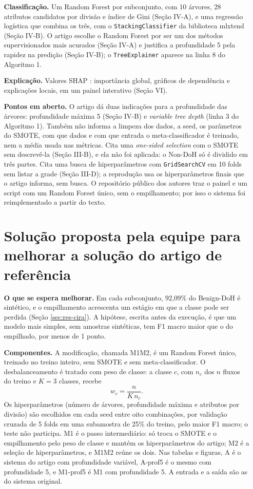 \documentclass[conference]{IEEEtran}
\begin{document}
\textbf{Classificação.} Um Random Forest por subconjunto, com 10 árvores, 28 atributos candidatos por divisão e índice de Gini (Seção IV-A), e uma regressão logística que combina os três, com o \texttt{StackingClassifier} da biblioteca mlxtend (Seção IV-B). O artigo escolhe o Random Forest por ser um dos métodos supervisionados mais acurados (Seção IV-A) e justifica a profundidade 5 pela rapidez na predição (Seção IV-B); o \texttt{TreeExplainer} aparece na linha 8 do Algoritmo 1.

\textbf{Explicação.} Valores SHAP \cite{lundberg2017}: importância global, gráficos de dependência e explicações locais, em um painel interativo (Seção VI).

\textbf{Pontos em aberto.} O artigo dá duas indicações para a profundidade das árvores: profundidade máxima 5 (Seção IV-B) e \textit{variable tree depth} (linha 3 do Algoritmo 1). Também não informa a limpeza dos dados, a seed, os parâmetros do SMOTE, com que dados e com que entrada o meta-classificador é treinado, nem a média usada nas métricas. Cita uma \textit{one-sided selection} com o SMOTE sem descrevê-la (Seção III-B), e ela não foi aplicada: o Non-DoH só é dividido em três partes. Cita uma busca de hiperparâmetros com \texttt{GridSearchCV} em 10 folds sem listar a grade (Seção III-D); a reprodução usa os hiperparâmetros finais que o artigo informa, sem busca. O repositório público dos autores traz o painel e um script com um Random Forest único, sem o empilhamento; por isso o sistema foi reimplementado a partir do texto.

\section{Solução proposta pela equipe para melhorar a solução do artigo de referência}
\label{sec:equipe}

\textbf{O que se espera melhorar.} Em cada subconjunto, 92,09\% do Benign-DoH é sintético, e o empilhamento acrescenta um estágio em que a classe pode ser perdida (Seção \ref{sec:res-cira}). A hipótese, escrita antes da execução, é que um modelo mais simples, sem amostras sintéticas, tem F1 macro maior que o do empilhado, por menos de 1 ponto.

\textbf{Componentes.} A modificação, chamada M1M2, é um Random Forest único, treinado no treino inteiro, sem SMOTE e sem meta-classificador. O desbalanceamento é tratado com peso de classe: a classe $c$, com $n_c$ dos $n$ fluxos do treino e $K=3$ classes, recebe
\begin{equation}
w_c = \frac{n}{K\, n_c}.
\label{eq:peso}
\end{equation}
Os hiperparâmetros (número de árvores, profundidade máxima e atributos por divisão) são escolhidos em cada seed entre oito combinações, por validação cruzada de 5 folds em uma subamostra de 25\% do treino, pelo maior F1 macro; o teste não participa. M1 é o passo intermediário: só troca o SMOTE e o empilhamento pelo peso de classe e mantém os hiperparâmetros do artigo; M2 é a seleção de hiperparâmetros, e M1M2 reúne os dois. Nas tabelas e figuras, A é o sistema do artigo com profundidade variável, A-prof5 é o mesmo com profundidade 5, e M1-prof5 é M1 com profundidade 5. A entrada e a saída são as do sistema original.
\end{document}
